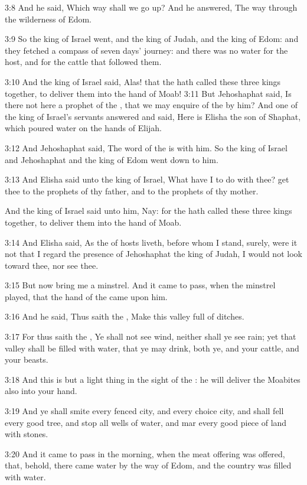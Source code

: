 3:8 And he said, Which way shall we go up? And he answered, The way through the wilderness of Edom.

3:9 So the king of Israel went, and the king of Judah, and the king of Edom: and they fetched a compass of seven days' journey: and there was no water for the host, and for the cattle that followed them.

3:10 And the king of Israel said, Alas! that the \LORD hath called these three kings together, to deliver them into the hand of Moab!  3:11 But Jehoshaphat said, Is there not here a prophet of the \LORD, that we may enquire of the \LORD by him? And one of the king of Israel's servants answered and said, Here is Elisha the son of Shaphat, which poured water on the hands of Elijah.

3:12 And Jehoshaphat said, The word of the \LORD is with him. So the king of Israel and Jehoshaphat and the king of Edom went down to him.

3:13 And Elisha said unto the king of Israel, What have I to do with thee?  get thee to the prophets of thy father, and to the prophets of thy mother.

And the king of Israel said unto him, Nay: for the \LORD hath called these three kings together, to deliver them into the hand of Moab.

3:14 And Elisha said, As the \LORD of hosts liveth, before whom I stand, surely, were it not that I regard the presence of Jehoshaphat the king of Judah, I would not look toward thee, nor see thee.

3:15 But now bring me a minstrel. And it came to pass, when the minstrel played, that the hand of the \LORD came upon him.

3:16 And he said, Thus saith the \LORD, Make this valley full of ditches.

3:17 For thus saith the \LORD, Ye shall not see wind, neither shall ye see rain; yet that valley shall be filled with water, that ye may drink, both ye, and your cattle, and your beasts.

3:18 And this is but a light thing in the sight of the \LORD: he will deliver the Moabites also into your hand.

3:19 And ye shall smite every fenced city, and every choice city, and shall fell every good tree, and stop all wells of water, and mar every good piece of land with stones.

3:20 And it came to pass in the morning, when the meat offering was offered, that, behold, there came water by the way of Edom, and the country was filled with water.

